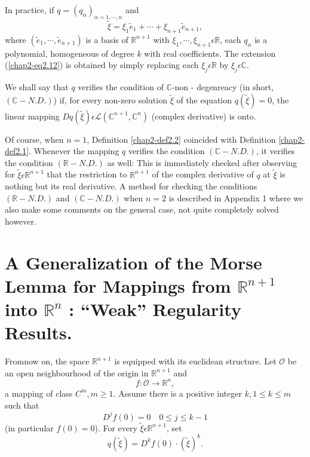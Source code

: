 \begin{remark}\label{chap2-rem2.3}
In practice, if $q = (q_{\alpha})_{\alpha = 1, \cdots, n}$ and
$$
\widetilde{\xi} = \xi_{1}\widetilde{e}_{1} + \cdots + \xi_{n+1} \widetilde{e}_{n+1},
$$
where $(\widetilde{e}_{1}, \cdots, \widetilde{e}_{n+1})$ is a basis of $\mathbb{R}^{n+1}$ with $\xi_{1}, \cdots, \xi_{n+1} \epsilon \mathbb{R}$, each $q_{\alpha}$ is a polynomial, homogeneous of degree $k$ with real coefficients. The extension (\ref{chap2-eq2.12}) is obtained by simply replacing each $\xi_{j} \epsilon \mathbb{R}$ by $\xi_{j} \epsilon \mathbb{C}$.
\end{remark}

\begin{definition}\label{chap2-def2.2}
We shall say that $q$ verifies the condition of $\mathbb{C}$-non - degenreacy (in short, $(\mathbb{C}-N.D.)$) if, for every non-zero solution $\widetilde{\xi}$ of the equation $q(\widetilde{\xi}) = 0$, the linear mapping $Dq(\widetilde{\xi}) \epsilon \mathscr{L} (\mathbb{C}^{n+1}, \mathbb{C}^{n})$ (complex derivative) is onto.
\end{definition}

Of course, when $n = 1$, Definition \ref{chap2-def2.2} coincided with Definition \ref{chap2-def2.1}. Whenever the mapping $q$ verifies the condition $(\mathbb{C}-N.D.)$, it verifies the condition $(\mathbb{R}-N.D.)$ as well: This is immediately checked after observing for $\widetilde{\xi} \epsilon \mathbb{R}^{n+1}$ that the restriction to $\mathbb{R}^{n+1}$ of the complex derivative of $q$ at $\widetilde{\xi}$ is nothing but its real derivative. A method for checking the conditions $(\mathbb{R}-N.D.)$ and $(\mathbb{C}-N.D.)$ when $n = 2$ is described in Appendix 1 where we also make some comments on the general case, not quite completely solved however.

\section[A Generalization of the Morse Lemma.....]{A Generalization of the Morse Lemma for Mappings from $\mathbb{R}^{n+1}$ into $\mathbb{R}^{n}$ : ``Weak'' Regularity Results.}\label{chap2-sec3}

From\pageoriginale now on, the space $\mathbb{R}^{n+1}$ is equipped with its euclidean structure. Let $\mathscr{O}$ be an open neighbourhood of the origin in $\mathbb{R}^{n+1}$ and
$$
f : \mathscr{O} \to \mathbb{R}^{n},
$$
a mapping of class $C^{m}, m \geq 1$. Assume there is a positive integer $k, 1 \leq k \leq m$ such that
\begin{equation*}
D^{j}f(0) = 0 \quad 0 \leq j \leq k-1\tag{3.1}\label{chap2-eq3.1}
\end{equation*}
(in particular $f(0) = 0$). For every $\widetilde{\xi} \epsilon \mathbb{R}^{n+1}$, set
\begin{equation*}
q(\widetilde{\xi}) = D^{k}f(0) \cdot
(\widetilde{\xi})^{k}.\tag{3.2}\label{chap2-3.2}
\end{equation*}

